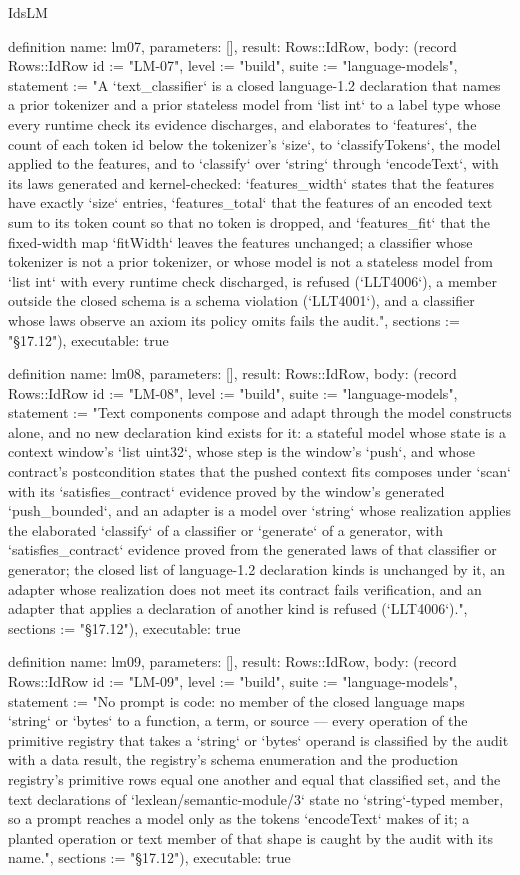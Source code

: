 \begin{lexlean}{IdsLM}
\begin{semanticmodule}
definition{
  name: lm07,
  parameters: [],
  result: Rows::IdRow,
  body: (record Rows::IdRow {id := "LM-07", level := "build", suite := "language-models", statement := "A `text_classifier` is a closed language-1.2 declaration that names a prior tokenizer and a prior stateless model from `list int` to a label type whose every runtime check its evidence discharges, and elaborates to `features`, the count of each token id below the tokenizer's `size`, to `classifyTokens`, the model applied to the features, and to `classify` over `string` through `encodeText`, with its laws generated and kernel-checked: `features_width` states that the features have exactly `size` entries, `features_total` that the features of an encoded text sum to its token count so that no token is dropped, and `features_fit` that the fixed-width map `fitWidth` leaves the features unchanged; a classifier whose tokenizer is not a prior tokenizer, or whose model is not a stateless model from `list int` with every runtime check discharged, is refused (`LLT4006`), a member outside the closed schema is a schema violation (`LLT4001`), and a classifier whose laws observe an axiom its policy omits fails the audit.", sections := "§17.12"}),
  executable: true
}

definition{
  name: lm08,
  parameters: [],
  result: Rows::IdRow,
  body: (record Rows::IdRow {id := "LM-08", level := "build", suite := "language-models", statement := "Text components compose and adapt through the model constructs alone, and no new declaration kind exists for it: a stateful model whose state is a context window's `list uint32`, whose step is the window's `push`, and whose contract's postcondition states that the pushed context fits composes under `scan` with its `satisfies_contract` evidence proved by the window's generated `push_bounded`, and an adapter is a model over `string` whose realization applies the elaborated `classify` of a classifier or `generate` of a generator, with `satisfies_contract` evidence proved from the generated laws of that classifier or generator; the closed list of language-1.2 declaration kinds is unchanged by it, an adapter whose realization does not meet its contract fails verification, and an adapter that applies a declaration of another kind is refused (`LLT4006`).", sections := "§17.12"}),
  executable: true
}

definition{
  name: lm09,
  parameters: [],
  result: Rows::IdRow,
  body: (record Rows::IdRow {id := "LM-09", level := "build", suite := "language-models", statement := "No prompt is code: no member of the closed language maps `string` or `bytes` to a function, a term, or source — every operation of the primitive registry that takes a `string` or `bytes` operand is classified by the audit with a data result, the registry's schema enumeration and the production registry's primitive rows equal one another and equal that classified set, and the text declarations of `lexlean/semantic-module/3` state no `string`-typed member, so a prompt reaches a model only as the tokens `encodeText` makes of it; a planted operation or text member of that shape is caught by the audit with its name.", sections := "§17.12"}),
  executable: true
}


\end{semanticmodule}
\end{lexlean}
